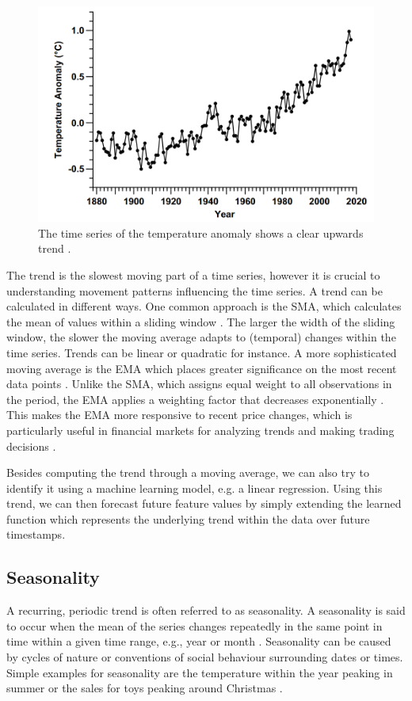 \begin{figure}[h]
    \centering
    \includegraphics[width=0.75\linewidth]{img/Time Series Trend.png}
    \caption{The time series of the temperature anomaly shows a clear upwards trend \parencite[p. 311]{mudelsee2019trend}.}
    \label{fig:ts_trend}
\end{figure}

The trend is the slowest moving part of a time series, however it is crucial to understanding movement patterns influencing the time series. A trend can be calculated in different ways. One common approach is the \ac{SMA}, which calculates the mean of values within a sliding window \parencite{klinker2011exponential}. The larger the width of the sliding window, the slower the moving average adapts to (temporal) changes within the time series. Trends can be linear or quadratic for instance. A more sophisticated moving average is the \ac{EMA} which places greater significance on the most recent data points \parencite{hansun2013new}. Unlike the \ac{SMA}, which assigns equal weight to all observations in the period, the EMA applies a weighting factor that decreases exponentially \parencite{klinker2011exponential}. This makes the EMA more responsive to recent price changes, which is particularly useful in financial markets for analyzing trends and making trading decisions \parencite{dzikevivcius2010ema}.

Besides computing the trend through a moving average, we can also try to identify it using a machine learning model, e.g. a linear regression. Using this trend, we can then forecast future feature values by simply extending the learned function which represents the underlying trend within the data over future timestamps.

\subsection{Seasonality}
\label{subsec:seasonality}
A recurring, periodic trend is often referred to as seasonality. A seasonality is said to occur when the mean of the series changes repeatedly in the same point in time within a given time range, e.g., year or month \parencite{haben2023time}. Seasonality can be caused by cycles of nature or conventions of social behaviour surrounding dates or times. Simple examples for seasonality are the temperature within the year peaking in summer or the sales for toys peaking around Christmas \parencite{haben2023time}.

